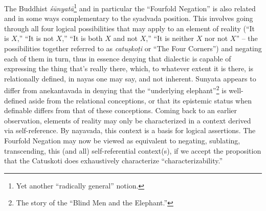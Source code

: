 \documentclass[pra,twocolumn,groupedaddress,10pt]{revtex4}
\theoremstyle{definition}
\begin{document}
\begin{enumerate}[label={[\textbf{\arabic*}]},start=0]
		The Buddhist \emph{\'{s}\={u}nyat\={a}}\footnote{Yet another ``radically general'' notion.} and in particular the ``Fourfold Negation'' is also related and in some ways complementary to the syadvada position. This involves going through all four logical possibilities that may apply to an element of reality (``It is $X$,'' ``It is not $X$,'' ``It is both $X$ and not $X$,'' ``It is neither $X$ nor not $X$'' -- the possibilities together referred to as \emph{catu\d{s}ko\d{t}i} or ``The Four Corners'') and negating each of them in turn, thus in essence denying that dialectic is capable of expressing the thing that's really there, which, to whatever extent it is there, is relationally defined, in nayas one may say, and not inherent. Sunyata appears to differ from anekantavada in denying that the ``underlying elephant''\footnote{The story of the ``Blind Men and the Elephant.''} is well-defined aside from the relational conceptions, or that its epistemic status when definable differs from that of these conceptions. Coming back to an earlier observation, elements of reality may only be characterized in a context derived via self-reference. By nayavada, this context is a basis for logical assertions. The Fourfold Negation may now be viewed as equivalent to negating, sublating, transcending, this (and all) self-referential context(s), if we accept the proposition that the Catuskoti does exhaustively characterize ``characterizability.''


\end{enumerate}
\end{document}
